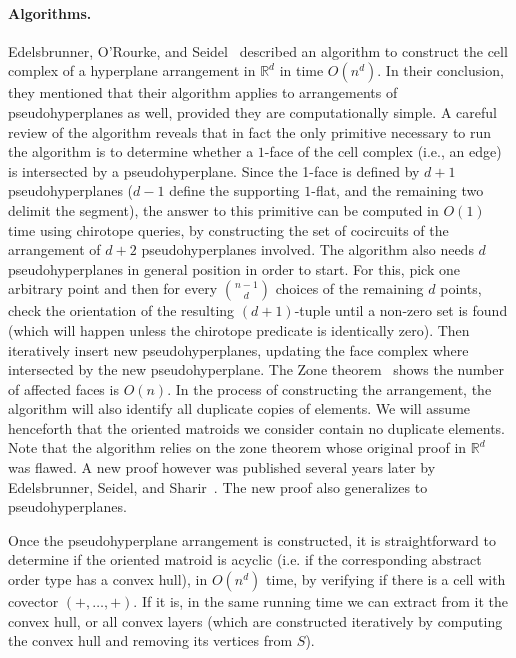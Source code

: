 \documentclass[leqno,12pt]{article}
\def\R{\mathbb{R}}
\begin{document}
\paragraph{Algorithms.}
Edelsbrunner, O'Rourke, and Seidel~\cite{journals/siamcomp/EdelsbrunnerOS86} 
described an algorithm to construct the cell complex of a hyperplane
arrangement in $\R^d$ in time $O(n^d)$. In their conclusion, they
mentioned that their algorithm applies to arrangements of
pseudohyperplanes as well, provided they are computationally simple.
 A careful review of the algorithm reveals that in fact the only
primitive necessary to run the algorithm is to determine whether a
$1$-face of the cell complex (i.e., an edge) is intersected by a
pseudohyperplane. Since the 1-face is defined by $d{+}1$
pseudohyperplanes ($d{-}1$ define the supporting $1$-flat, and the
remaining two delimit the segment), the answer to this primitive can
be computed in $O(1)$ time using chirotope queries, by constructing
the set of cocircuits  of the arrangement of $d{+}2$ pseudohyperplanes
involved. 
The algorithm also needs $d$ pseudohyperplanes in general position in
order to start. For this, pick one arbitrary point and then for every 
${n{-}1}\choose d$ choices of the remaining $d$ points, check the orientation
of the resulting $(d{+}1)$-tuple until a non-zero set is found (which
will happen unless the chirotope predicate is identically 
zero).  
Then iteratively insert
new pseudohyperplanes, updating
the face complex where intersected by the new pseudohyperplane. The
Zone theorem~\cite{Edelsbrunner:1993:ZTH:153794.153828} shows the number of affected faces is $O(n)$.
In the process of constructing the arrangement, the algorithm will
also identify all duplicate copies of elements. We will assume
henceforth that the oriented matroids we consider contain no duplicate
elements.
Note that the algorithm relies on the zone theorem whose
original proof in $\R^d$ was flawed. A new proof however was published
several years later by Edelsbrunner, Seidel, and Sharir~\cite{Edelsbrunner:1993:ZTH:153794.153828}. The new proof also generalizes to pseudohyperplanes.

Once the pseudohyperplane arrangement is constructed, it is
straightforward to determine if the oriented matroid is acyclic
(i.e. if the corresponding abstract order type has a convex hull), in
$O(n^d)$ time, by verifying if there is a cell with covector $(+,\ldots,+)$.  
If it is, in the same running time we can extract from it the convex hull, or all convex
layers (which are constructed iteratively by computing the convex
hull and removing its vertices from $S$). \\
\end{document}
